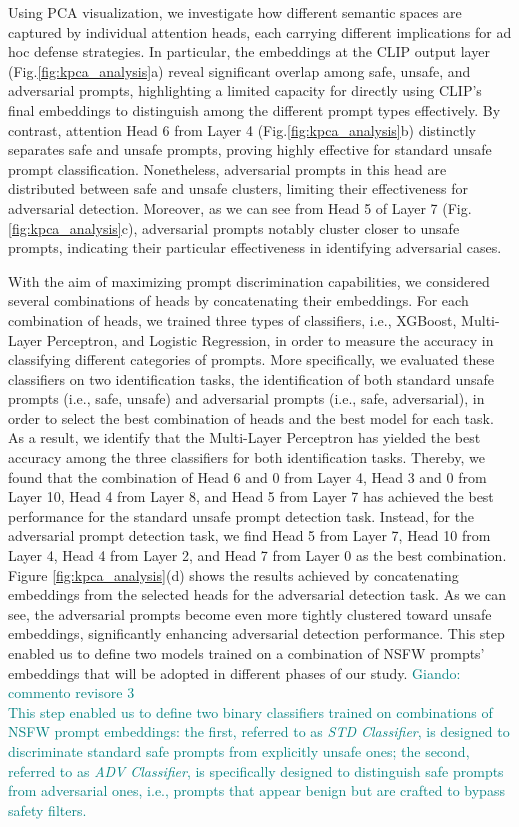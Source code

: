\documentclass[acmsmall]{acmart}
\newcommand{\giando}[1]{\textcolor{teal}{Giando: #1}}
\begin{document}
{Using PCA visualization, we investigate how different semantic spaces are captured by individual attention heads, each carrying different implications for ad hoc defense strategies. In particular, the embeddings at the CLIP output layer (Fig.\ref{fig:kpca_analysis}a) reveal significant overlap among safe, unsafe, and adversarial prompts, highlighting a limited capacity for directly using CLIP's final embeddings to distinguish among the different prompt types effectively. By contrast, attention Head 6 from Layer 4 (Fig.\ref{fig:kpca_analysis}b) distinctly separates safe and unsafe prompts, proving highly effective for standard unsafe prompt classification. Nonetheless, adversarial prompts in this head are distributed between safe and unsafe clusters, limiting their effectiveness for adversarial detection. 
Moreover, as we can see from Head 5 of Layer 7 (Fig.\ref{fig:kpca_analysis}c), adversarial prompts notably cluster closer to unsafe prompts, indicating their particular effectiveness in identifying adversarial cases. 

With the aim of maximizing prompt discrimination capabilities, we considered several combinations of heads by concatenating their embeddings. For each combination of heads, we trained three types of classifiers, i.e., XGBoost, Multi-Layer Perceptron, and Logistic Regression, in order to measure the accuracy in classifying different categories of prompts. More specifically, we evaluated these classifiers on two identification tasks, the identification of both standard unsafe prompts (i.e., safe, unsafe) and adversarial prompts (i.e., safe, adversarial), in order to select the best combination of heads and the best model for each task. 
As a result, we identify that the Multi-Layer Perceptron has yielded the best accuracy among the three classifiers for both identification tasks. Thereby, we found that the combination of Head 6 and 0 from Layer 4, Head 3 and 0 from Layer 10, Head 4 from Layer 8, and Head 5 from Layer 7 has achieved the best performance for the standard unsafe prompt detection task. Instead, for the adversarial prompt detection task, we find Head 5 from Layer 7, Head 10 from Layer 4, Head 4 from Layer 2, and Head 7 from Layer 0 as the best combination. Figure \ref{fig:kpca_analysis}(d) shows the results achieved by concatenating embeddings from the selected heads for the adversarial detection task. As we can see, the adversarial prompts become even more tightly clustered toward unsafe embeddings, significantly enhancing adversarial detection performance. This step enabled us to define two models trained on a combination of NSFW prompts' embeddings that will be adopted in different phases of our study.
\giando{ commento revisore 3\\
This step enabled us to define two binary classifiers trained on combinations of NSFW prompt embeddings: the first, referred to as \textit{STD Classifier}, is designed to discriminate standard safe prompts from explicitly unsafe ones; the second, referred to as \textit{ADV Classifier}, is specifically designed to distinguish safe prompts from adversarial ones, i.e., prompts that appear benign but are crafted to bypass safety filters.
}

}
\end{document}
